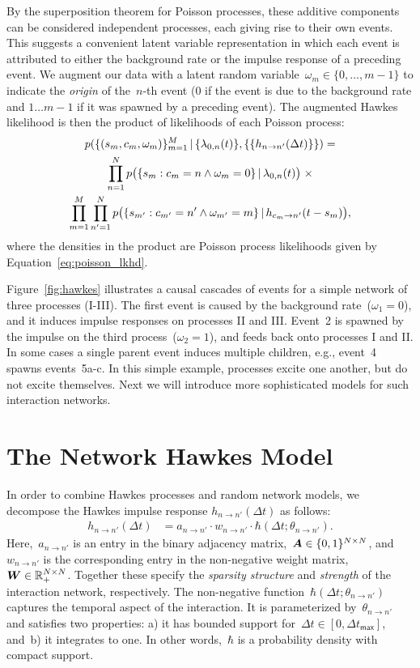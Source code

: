 By the superposition theorem for Poisson processes, these additive
components can be considered independent processes, each giving rise
to their own events.  This suggests a convenient latent variable
representation in which each event is attributed to either the
background rate or the impulse response of a preceding event.  We
augment our data with a latent random
variable~${\omega_m \in\{0,\ldots, m-1\}}$ to indicate the \emph{origin} of
the~$n$-th event ($0$ if the event is due to the background rate and
${1\ldots m-1}$ if it was spawned by a preceding event). The augmented
Hawkes likelihood is then the product of likelihoods of each Poisson
process:
\begin{multline}
  \label{eq:hawkes_likelihood}
p(\{(s_m,c_m,\omega_m)\}_{m=1}^M \,|\, \{\lambda_{0,n}(t)\}, \{\{h_{n \to n'}(\Delta t)\}\}) = \\
\prod_{n=1}^N p \big(\{s_{m}: c_{m}=n \wedge \omega_{m}=0\} \,|\, \lambda_{0,n}(t) \big) \; \times\\
\prod_{m=1}^M \prod_{n'=1}^N p \big(\{s_{m'}: c_{m'}=n' \wedge \omega_{m'}=m\} \,|\, h_{c_m \to n'}(t-s_m) \big),
\end{multline}
where the densities in the product are Poisson process likelihoods
given by Equation~\ref{eq:poisson_lkhd}.

Figure~\ref{fig:hawkes} illustrates a causal cascades of events for a
simple network of three processes (I-III).  The first event is caused
by the background rate~(${\omega_1=0}$), and it induces impulse responses
on processes II and III. Event~2 is spawned by the impulse on the
third process~(${\omega_2=1}$), and feeds back onto processes I and II. In
some cases a single parent event induces multiple children, e.g.,
event~4 spawns events~{5a-c}. In this simple example, processes excite
one another, but do not excite themselves. Next we will introduce more
sophisticated models for such interaction networks.

\section{The Network Hawkes Model}
\label{sec:network_hawkes_model}
In order to combine Hawkes processes and random network models, we
decompose the Hawkes impulse response $h_{n \to n'}(\Delta t)$ as
follows:
\begin{align}
\label{eq:ir_decomp}
h_{n \to n'}(\Delta t) &= a_{n \to n'} \cdot w_{n \to n'} \cdot \hbar(\Delta t; \theta_{n \to n'}).
\end{align}
Here,~$a_{n \to n'}$ is an entry in the binary adjacency
matrix,~${\boldsymbol{A}\in\{0,1\}^{N \times N}}$,
and~$w_{n \to n'}$ is the corresponding entry in the non-negative
weight matrix,~${\boldsymbol{W} \in\mathbb{R}_+^{N\times N}}$. Together these specify
the \emph{sparsity structure} and \emph{strength} of the interaction
network, respectively. The non-negative function~${\hbar(\Delta t;
  \theta_{n \to n'})}$ captures the temporal aspect of the
interaction. It is parameterized by~${\theta_{n \to n'}}$ and
satisfies two properties: a) it has bounded support for~${\Delta t \in
  [0,\Delta t_{\mathsf{max}}]}$, and~b) it integrates to one. In other
words,~$\hbar$ is a probability density with compact support.

